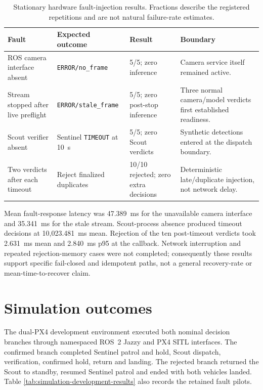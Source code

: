 \begin{table}[H]
  \centering
  \caption{Stationary hardware fault-injection results. Fractions describe the
  registered repetitions and are not natural failure-rate estimates.}
  \label{tab:hardware-fault-results}
  \scriptsize
  \begin{tabularx}{\textwidth}{@{}p{}p{}p{}X@{}}
    \toprule
    Fault & Expected outcome & Result & Boundary \\
    \midrule
    ROS camera interface absent & \texttt{ERROR/no\_frame} & 5/5; zero inference & Camera service itself remained active. \\
    Stream stopped after live preflight & \texttt{ERROR/stale\_frame} & 5/5; zero post-stop inference & Three normal camera/model verdicts first established readiness. \\
    Scout verifier absent & Sentinel \texttt{TIMEOUT} at 10~s & 5/5; zero Scout verdicts & Synthetic detections entered at the dispatch boundary. \\
    Two verdicts after each timeout & Reject finalized duplicates & 10/10 rejected; zero extra decisions & Deterministic late/duplicate injection, not network delay. \\
    \bottomrule
  \end{tabularx}
\end{table}

Mean fault-response latency was 47.389~ms for the unavailable camera interface
and 35.341~ms for the stale stream. Scout-process absence produced timeout
decisions at 10,023.481~ms mean. Rejection of the ten post-timeout verdicts
took 2.631~ms mean and 2.840~ms p95 at the callback. Network interruption and
repeated rejection-memory cases were not completed; consequently these results
support specific fail-closed and idempotent paths, not a general recovery-rate
or mean-time-to-recover claim.

\section{Simulation outcomes}
\label{sec:results:6}

The dual-PX4 development environment executed both nominal decision branches
through namespaced ROS~2 Jazzy and PX4 SITL interfaces. The confirmed branch
completed Sentinel patrol and hold, Scout dispatch, verification, confirmed
hold, return and landing. The rejected branch returned the Scout to standby,
resumed Sentinel patrol and ended with both vehicles landed. Table
\ref{tab:simulation-development-results} also records the retained fault
pilots.

